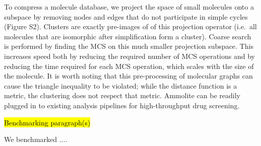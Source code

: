 \documentclass[review,preprint,12pt]{elsarticle}
\theoremstyle{definition}
\theoremstyle{remark}
\numberwithin{equation}{section}
\begin{document}
To compress a molecule database, we project the space of small molecules onto a subspace by removing nodes and edges that do not participate in simple cycles
(Figure S2).
Clusters are exactly pre-images of of this projection operator (i.e.~all molecules that are isomorphic after simplification form a cluster).
Coarse search is performed by finding the MCS on this much smaller projection subspace. This increases speed both by reducing the required number of MCS operations 
and by reducing the time required for each MCS operation, which scales with the size of the molecule.
It is worth noting that this pre-processing of molecular graphs can cause the 
triangle inequality to be violated; while the distance function is a metric, the
clustering does not respect that metric.
Ammolite can be readily plugged in to existing analysis pipelines for 
high-throughput drug screening.


\hl{Benchmarking paragraph(s)}

We benchmarked ....
\end{document}
